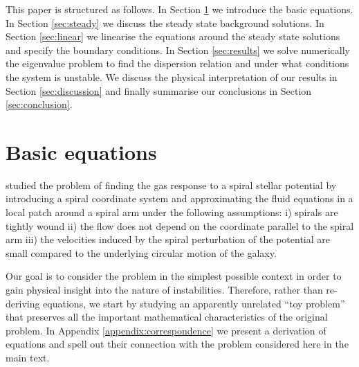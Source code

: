 \documentclass[useAMS,usenatbib]{mn2e}
\begin{document}
This paper is structured as follows. In Section \ref{sec:basic} we introduce the basic equations. In Section \ref{sec:steady} we discuss the steady state background solutions. In Section \ref{sec:linear} we linearise the equations around the steady state solutions and specify the boundary conditions. In Section \ref{sec:results} we solve numerically the eigenvalue problem to find the dispersion relation and under what conditions the system is unstable. We discuss the physical interpretation of our results in Section \ref{sec:discussion} and finally summarise our conclusions in Section \ref{sec:conclusion}.

\section{Basic equations} \label{sec:basic}
%
\cite{Roberts1969} studied the problem of finding the gas response to a spiral stellar potential by introducing a spiral coordinate system and approximating the fluid equations in a local patch around a spiral arm under the following assumptions: i) spirals are tightly wound ii) the flow does not depend on the coordinate parallel to the spiral arm iii) the velocities induced by the spiral perturbation of the potential are small compared to the underlying circular motion of the galaxy.

Our goal is to consider the problem in the simplest possible context in order to gain physical insight into the nature of instabilities. Therefore, rather than re-deriving \cite{Roberts1969} equations, we start by studying an apparently unrelated ``toy problem'' that preserves all the important mathematical characteristics of the original problem. In Appendix \ref{appendix:correspondence} we present a derivation of \cite{Roberts1969} equations and spell out their connection with the problem considered here in the main text.
\end{document}
